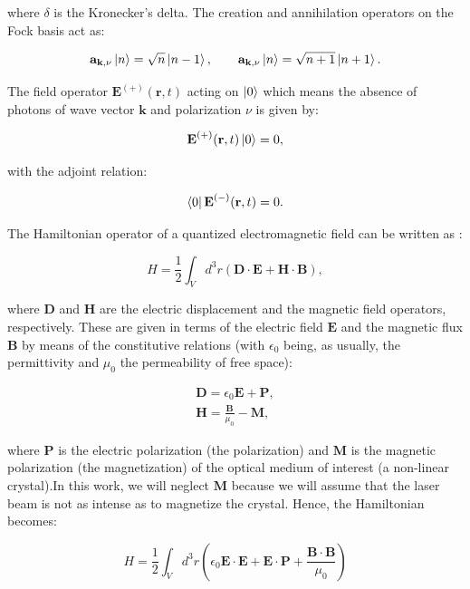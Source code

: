 \documentclass{book}
\begin{document}
where $\delta$ is the Kronecker's delta. The creation and annihilation operators on the Fock basis act as:

\begin{equation}
    \mathbf{a}_{\textbf{k},\nu}\ket{n}=\sqrt{n}\ket{n-1},\qquad
    \mathbf{a}_{\textbf{k},\nu}\ket{n}=\sqrt{n+1}\ket{n+1}.\label{Fock}
\end{equation}

The field operator $\textbf{E}^{(+)} (\textbf{r},t)$ acting on $\ket{0}$ which means the absence of photons of wave vector $\mathbf{k}$ and polarization $\nu$ is given by:

\begin{equation}
\textbf{E}^{(+)} (\textbf{r},t)\ket{0}=0,
\end{equation}

 with the adjoint relation:

\begin{equation}
\bra{0}\textbf{E}^{(-)} (\textbf{r},t)=0.
\end{equation}

The Hamiltonian operator of a quantized electromagnetic field can be written as \cite{jackson}:

\begin{equation}
H=\frac{1}{2}\int_{V} d^{3}r (\mathbf{D \cdot E}+\mathbf{H \cdot B}),
\end{equation}

where $\textbf{D}$ and $\textbf{H}$ are the electric displacement and the magnetic field operators, respectively. These are given in terms of the electric field $\textbf{E}$ and the magnetic flux $\textbf{B}$ by means of the constitutive relations (with $\epsilon_{0} $ being, as usually, the permittivity and $\mu_{0}$ the permeability of free space):


\begin{align}
\textbf{D}= \epsilon_{0} \textbf{E}+\textbf{P},\\
\textbf{H}=\frac{\textbf{B}}{\mu_{0}}-\textbf{M},
\end{align}

where $\mathbf{P}$ is the electric polarization (the polarization) and $\mathbf{M}$ is the magnetic polarization (the magnetization) of the optical medium of interest (a non-linear crystal).In this work, we will neglect $\textbf{M}$ because we will assume that the laser beam is not as intense as to magnetize the crystal. Hence, the Hamiltonian becomes:

\begin{equation}
H=\frac{1}{2}\int_{V} d^{3}r \left(\epsilon_{0}\mathbf{E \cdot E}+\mathbf{E \cdot P}+\frac{\mathbf{B \cdot B}}{\mu_{0}} \right)
\end{equation}
\end{document}
